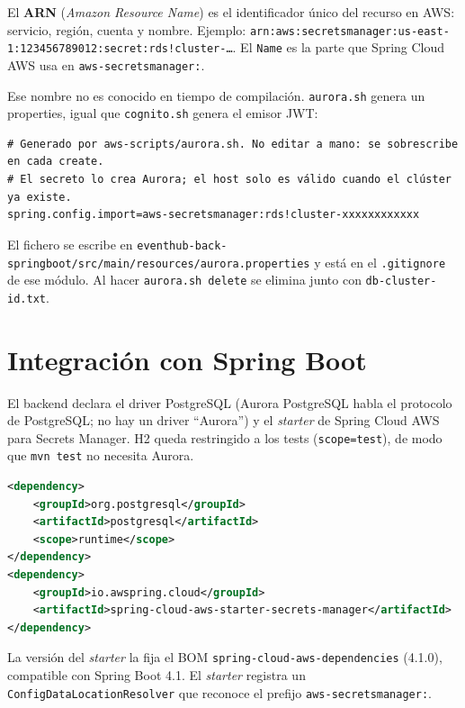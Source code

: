 \documentclass[12pt,a4paper]{article}
\begin{document}
\vspace{1em}

El \textbf{ARN} (\textit{Amazon Resource Name}) es el identificador único del recurso en AWS: servicio, región, cuenta y nombre. Ejemplo: \texttt{arn:aws:secretsmanager:us-east-1:123456789012:secret:rds!cluster-\ldots}. El \texttt{Name} es la parte que Spring Cloud AWS usa en \texttt{aws-secretsmanager:}.

Ese nombre no es conocido en tiempo de compilación. \texttt{aurora.sh} genera un properties, igual que \texttt{cognito.sh} genera el emisor JWT:

\begin{lstlisting}[language=properties,basicstyle=\ttfamily\footnotesize]
# Generado por aws-scripts/aurora.sh. No editar a mano: se sobrescribe en cada create.
# El secreto lo crea Aurora; el host solo es válido cuando el clúster ya existe.
spring.config.import=aws-secretsmanager:rds!cluster-xxxxxxxxxxxx
\end{lstlisting}

\vspace{1em}

El fichero se escribe en \texttt{eventhub-back-springboot/src/main/resources/aurora.properties} y está en el \texttt{.gitignore} de ese módulo. Al hacer \texttt{aurora.sh delete} se elimina junto con \texttt{db-cluster-id.txt}.

\section{Integración con Spring Boot}

El backend declara el driver PostgreSQL (Aurora PostgreSQL habla el protocolo de PostgreSQL; no hay un driver ``Aurora'') y el \textit{starter} de Spring Cloud AWS para Secrets Manager. H2 queda restringido a los tests (\texttt{scope=test}), de modo que \texttt{mvn test} no necesita Aurora.

\begin{lstlisting}[language=XML,basicstyle=\ttfamily\footnotesize]
<dependency>
    <groupId>org.postgresql</groupId>
    <artifactId>postgresql</artifactId>
    <scope>runtime</scope>
</dependency>
<dependency>
    <groupId>io.awspring.cloud</groupId>
    <artifactId>spring-cloud-aws-starter-secrets-manager</artifactId>
</dependency>
\end{lstlisting}

\vspace{1em}

La versión del \textit{starter} la fija el BOM \texttt{spring-cloud-aws-dependencies} (4.1.0), compatible con Spring Boot 4.1. El \textit{starter} registra un \texttt{ConfigDataLocationResolver} que reconoce el prefijo \texttt{aws-secretsmanager:}.
\end{document}
